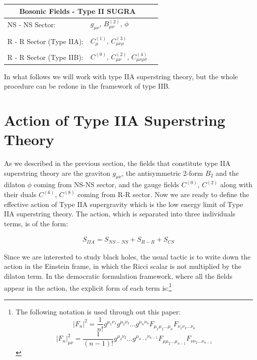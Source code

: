 \documentclass[a4paper,notitlepage]{report}
\begin{document}
\vspace{2em}

\begin{center}
\begin{tabular}{llr}
\toprule
\multicolumn{2}{c}{Bosonic Fields - Type II SUGRA} \\
\midrule
NS - NS Sector:  &$g_{\mu\nu}$, $B^{(2)}_{\mu\nu}$, $\phi$ \\\\
R - R Sector (Type IIA):  &$C^{(1)}_{\mu}$, $C^{(3)}_{\mu\nu\rho}$ \\\\
R - R Sector (Type IIB):  &$C^{(0)}$, $C^{(2)}_{\mu\nu}$, $C^{(4)}_{\mu\nu\rho\sigma}$ \\
\bottomrule
\end{tabular}
\end{center}

\vspace{2em}

In what follows we will work with type IIA superstring theory, but the whole procedure can be redone in the framework of type IIB.

\section{Action of Type IIA Superstring Theory}

As we described in the previous section, the fields that constitute type IIA superstring theory are the graviton $g_{\mu\nu}$, the antisymmetric 2-form $B_2$ and the dilaton $\phi$ coming from NS-NS sector, and the gauge fields $C^{(0)}$, $C^{(2)}$ along with their duals $C^{(6)}$, $C^{(8)}$ coming from R-R sector. Now we are ready to define the effective action of Type IIA supergravity which is the low energy limit of Type IIA superstring theory. The action, which is separated into three individuals terms, is of the form:

\begin{align} \label{4.1}
S_{IIA} = S_{NS-NS} + S_{R-R} + S_{CS}
\end{align}

\vspace{0.5em}
Since we are interested to study black holes, the usual tactic is to write down the action in the Einstein frame, in which the Ricci scalar is not multiplied by the dilaton term. In the democratic formulation framework, where all the fields appear in the action, the explicit form of each term is:\footnote{The following notation is used through out this paper:
\begin{equation*}
{|{F}_{n}|}^2 = \frac{1}{n!} g^{\mu_{1}\nu_{1}} g^{\mu_{2}\nu_{2}} \ldots g^{\mu_{n}\nu_{n}} {F}_{\mu_{1} \mu_{2} \ldots \mu_{n}} {F}_{\nu_{1} \nu_{2} \ldots \nu_{n}}
\end{equation*}
\begin{equation*}
{|{F}_{n}|}^2_{\mu\nu} =  \frac{1}{(n-1)!} g^{\mu_{2}\nu_{2}} \ldots g^{\mu_{n-1}\nu_{n-1}} {F}_{\mu \mu_{2} \ldots \mu_{n-1}} {F}_{\nu \nu_{2} \ldots \nu_{n-1}}
\end{equation*}}
\end{document}
